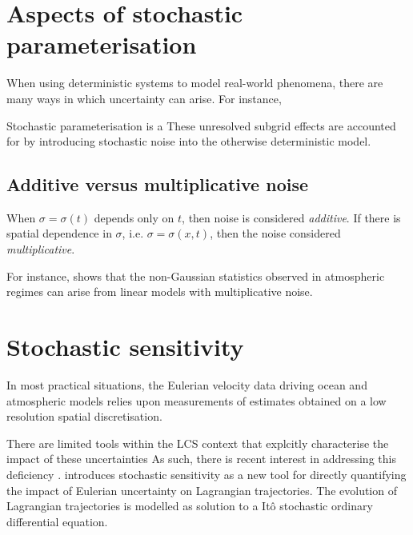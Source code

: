 \section{Aspects of stochastic parameterisation}
When using deterministic systems to model real-world phenomena, there are many ways in which uncertainty can arise. 
For instance, 

Stochastic parameterisation is a 
These unresolved subgrid effects are accounted for by introducing stochastic noise into the otherwise deterministic model. 

\citet{BernerEtAl_2017_StochasticParameterizationNew}

\citet{LeutbecherEtAl_2017_StochasticRepresentationsModel}

\subsection{Additive versus multiplicative noise}

When \(\sigma = \sigma(t)\) depends only on \(t\), then noise is considered \emph{additive}.
If there is spatial dependence in \(\sigma\), i.e. \(\sigma = \sigma(x,t)\), then the noise considered \emph{multiplicative}.



For instance, \citet{SuraEtAl_2005_MultiplicativeNoiseNonGaussianity} shows that the non-Gaussian statistics observed in atmospheric regimes can arise from linear models with multiplicative noise.




\section{Stochastic sensitivity}
In most practical situations, the Eulerian velocity data driving ocean and atmospheric models relies upon measurements of estimates obtained on a low resolution spatial discretisation.


There are limited tools within the LCS context that explcitly characterise the impact of these uncertainties
As such, there is recent interest in addressing this deficiency \citep{BalasuriyaGottwald_2018_EstimatingStableUnstablea, Balasuriya_2020_StochasticApproachesLagrangian}.
\citet{Balasuriya_2020_StochasticSensitivityComputable} introduces stochastic sensitivity as a new tool for directly quantifying the impact of Eulerian uncertainty on Lagrangian trajectories.
The evolution of Lagrangian trajectories is modelled as solution to a It\^o stochastic ordinary differential equation.

